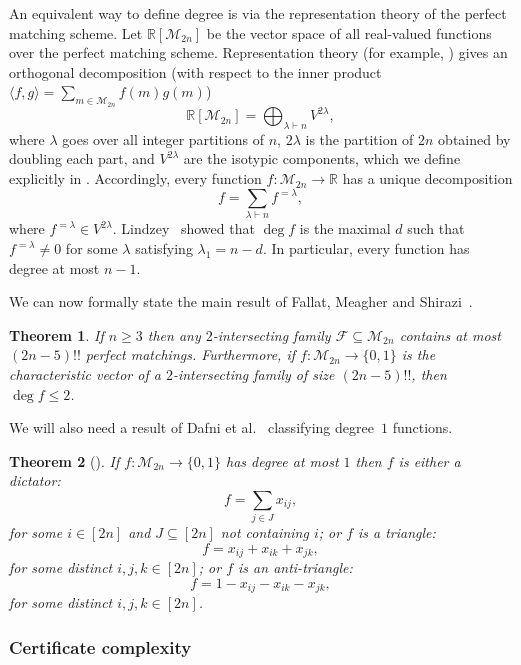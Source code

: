 \documentclass{article}
\newtheorem{theorem}{Theorem}[section]
\theoremstyle{definition}
\providecommand{\cM}{\mathcal{M}}
\begin{document}
An equivalent way to define degree is via the representation theory of the perfect matching scheme. Let $\mathbb{R}[\cM_{2n}]$ be the vector space of all real-valued functions over the perfect matching scheme. Representation theory (for example, \cite[Chapter 11]{CSST08}) gives an orthogonal decomposition (with respect to the inner product $\langle f, g \rangle = \sum_{m \in \cM_{2n}} f(m) g(m)$)
\[
 \mathbb{R}[\cM_{2n}] = \bigoplus_{\lambda \vdash n} V^{2\lambda},
\]
where $\lambda$ goes over all integer partitions of $n$, $2\lambda$ is the partition of $2n$ obtained by doubling each part, and $V^{2\lambda}$ are the isotypic components, which we define explicitly in . Accordingly, every function $f\colon \cM_{2n} \to \mathbb{R}$ has a unique decomposition
\[
 f = \sum_{\lambda \vdash n} f^{=\lambda},
\]
where $f^{=\lambda} \in V^{2\lambda}$. Lindzey~\cite[Theorem 5.1.1]{LindzeyThesis} showed that $\deg f$ is the maximal $d$ such that $f^{=\lambda} \neq 0$ for some $\lambda$ satisfying $\lambda_1 = n - d$. In particular, every function has degree at most $n - 1$.

We can now formally state the main result of Fallat, Meagher and Shirazi~\cite[Theorem 4.13]{FMS}.

\begin{theorem} \label{thm:FMS}
If $n \geq 3$ then any $2$-intersecting family $\mathcal{F} \subseteq \cM_{2n}$ contains at most $(2n-5)!!$ perfect matchings. Furthermore, if $f\colon \cM_{2n} \to \{0,1\}$ is the characteristic vector of a $2$-intersecting family of size $(2n-5)!!$, then $\deg f \leq 2$.
\end{theorem}

We will also need a result of Dafni et al.~\cite{DFLLV} classifying degree~$1$ functions.

\begin{theorem}[{\cite[Theorem 6.2]{DFLLV}}] \label{thm:degree1-classification-pms}
If $f\colon \cM_{2n} \to \{0,1\}$ has degree at most $1$ then $f$ is either a \emph{dictator}:
\[
 f = \sum_{j \in J} x_{ij},
\]
for some $i \in [2n]$ and $J \subseteq [2n]$ not containing $i$; or $f$ is a \emph{triangle}:
\[
 f = x_{ij} + x_{ik} + x_{jk},
\]
for some distinct $i,j,k \in [2n]$; or $f$ is an \emph{anti-triangle}:
\[
 f = 1 - x_{ij} - x_{ik} - x_{jk},
\]
for some distinct $i,j,k \in [2n]$.
\end{theorem}

\subsubsection{Certificate complexity} \label{sec:certificate-pms}
\end{document}
